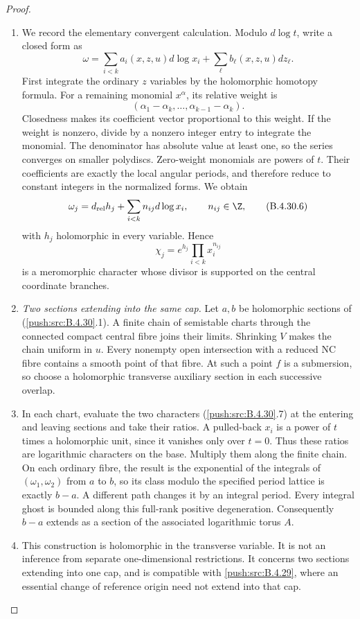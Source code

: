 \begin{proof}
\begin{enumerate}[label=\arabic*.,leftmargin=*]
\item We record the elementary convergent calculation.
Modulo $d\log t$, write a closed form as
\[
 \omega=\sum_{i<k}a_i(x,z,u)d\log x_i
                   +\sum_\ell b_\ell(x,z,u)dz_\ell.
\]
First integrate the ordinary $z$ variables by
the holomorphic homotopy formula. For a
remaining monomial $x^\alpha$, its relative
weight is
\[
 (\alpha_1-\alpha_k,\ldots,\alpha_{k-1}-\alpha_k).
\]
Closedness makes its coefficient vector
proportional to this weight. If the weight is
nonzero, divide by a nonzero integer entry to
integrate the monomial. The denominator has
absolute value at least one, so the series
converges on smaller polydiscs. Zero-weight
monomials are powers of $t$. Their coefficients
are exactly the local angular periods, and
therefore reduce to constant integers in the
normalized forms. We obtain
\[
 \omega_j=d_{\rm rel}h_j+
               \sum_{i<k}n_{ij}d\log x_i,
 \qquad n_{ij}\in\Z,
 \tag{B.4.30.6}
\]
with $h_j$ holomorphic in every variable.
Hence
\[
 \chi_j=e^{h_j}\prod_{i<k}x_i^{n_{ij}}
 \tag{B.4.30.7}
\]
is a meromorphic character whose divisor is
supported on the central coordinate branches.

\item \emph{Two sections extending into the same cap.}
Let $a,b$ be holomorphic sections of (\ref{push:src:B.4.30}.1).
A finite chain of semistable charts through the
connected compact central fibre joins their
limits. Shrinking $V$ makes the chain uniform
in $u$. Every nonempty open intersection with
a reduced NC fibre contains a smooth point of
that fibre. At such a point $f$ is a
submersion, so choose a holomorphic transverse
auxiliary section in each successive overlap.

\item In each chart, evaluate the two characters
(\ref{push:src:B.4.30}.7) at the entering and leaving sections
and take their ratios. A pulled-back $x_i$
is a power of $t$ times a holomorphic unit,
since it vanishes only over $t=0$. Thus these
ratios are logarithmic characters on the base.
Multiply them along the finite chain. On each
ordinary fibre, the result is the exponential
of the integrals of $(\omega_1,\omega_2)$ from
$a$ to $b$, so its class modulo the specified
period lattice is exactly $b-a$. A different
path changes it by an integral period. Every
integral ghost is bounded along this full-rank
positive degeneration. Consequently $b-a$
extends as a section of the associated
logarithmic torus $A$.

\item This construction is holomorphic in the
transverse variable. It is not an inference
from separate one-dimensional restrictions.
It concerns two sections extending into one
cap, and is compatible with \ref{push:src:B.4.29}, where an
essential change of reference origin need not
extend into that cap.


\end{enumerate}
\end{proof}
